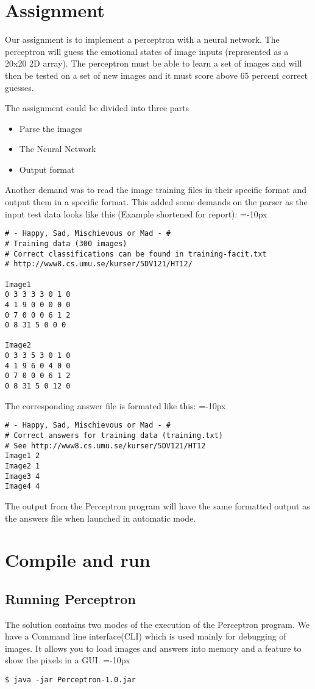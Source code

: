 \documentclass[a4paper, 12pt]{article}
\begin{document}
\clearpage\section{Assignment}
Our assignment is to implement a perceptron with a neural network. The perceptron will guess the emotional states of image inputs (represented as a 20x20 2D array). The perceptron must be able to learn a set of images and will then be tested on a set of new images and it must score above 65 percent correct guesses.

The assignment could be divided into three parts
\begin{itemize}
\item Parse the images
\item The Neural Network
\item Output format
\end{itemize}

Another demand was to read the image training files in their specific format and output them in a specific format. This added some demands on the parser as the input test data looks like this (Example shortened for report): 
\belowcaptionskip=-10px
\begin{lstlisting}[label=cd-example, caption=Sample images]
# - Happy, Sad, Mischievous or Mad - #
# Training data (300 images)
# Correct classifications can be found in training-facit.txt
# http://www8.cs.umu.se/kurser/5DV121/HT12/

Image1
0 3 3 3 3 0 1 0 
4 1 9 0 0 0 0 0 
0 7 0 0 0 6 1 2 
0 8 31 5 0 0 0

Image2
0 3 3 5 3 0 1 0 
4 1 9 6 0 4 0 0 
0 7 0 0 0 6 1 2 
0 8 31 5 0 12 0
\end{lstlisting}
\clearpage
The corresponding answer file is formated like this:
\belowcaptionskip=-10px
\begin{lstlisting}[label=cd-example, caption=Answers example]
# - Happy, Sad, Mischievous or Mad - #
# Correct answers for training data (training.txt)
# See http://www8.cs.umu.se/kurser/5DV121/HT12
Image1 2
Image2 1
Image3 4
Image4 4
\end{lstlisting}
The output from the Perceptron program will have the same formatted output as the answers file when launched in automatic mode.

\clearpage\section{Compile and run}
\subsection{Running Perceptron}
The solution contains two modes of the execution of the Perceptron program. We have a Command line interface(CLI) which is used mainly for debugging of images. It allows you to load images and answers into memory and a feature to show the pixels in a GUI.
\belowcaptionskip=-10px
\begin{lstlisting}[label=cd-example, caption=Launch in CLI Mode]
$ java -jar Perceptron-1.0.jar
\end{lstlisting}
\end{document}
